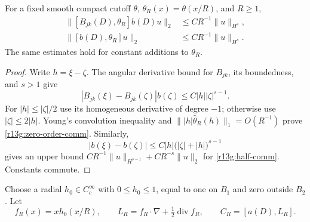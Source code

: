 \begin{lemma}
\label{lem:r13g-cutoff}
For a fixed smooth compact cutoff $\theta$, $\theta_R(x)=\theta(x/R)$,
and $R\ge1$,
\begin{align}
 \|[B_{jk}(D),\theta_R]b(D)u\|_2
 &\le CR^{-1}\|u\|_{H^s},\label{r13g:zero-order-comm}\\
 \|[b(D),\theta_R]u\|_2
 &\le CR^{-1}\|u\|_{H^s}.\label{r13g:half-comm}
\end{align}
The same estimates hold for constant additions to $\theta_R$.
\end{lemma}
\begin{proof}
Write $h=\xi-\zeta$. The angular derivative bound for $B_{jk}$,
its boundedness, and $s>1$ give
\[
 |B_{jk}(\xi)-B_{jk}(\zeta)|b(\zeta)
 \le C|h||\zeta|^{s-1}.
\]
For $|h|\le|\zeta|/2$ use its homogeneous derivative of degree $-1$;
otherwise use $|\zeta|\le2|h|$. Young's convolution inequality and
$\||h|\widehat\theta_R(h)\|_1=O(R^{-1})$ prove
\eqref{r13g:zero-order-comm}. Similarly,
\[
 |b(\xi)-b(\zeta)|
 \le C|h|\bigl(|\zeta|+|h|\bigr)^{s-1}
\]
gives an upper bound
$CR^{-1}\|u\|_{H^{s-1}}+CR^{-s}\|u\|_2$ for
\eqref{r13g:half-comm}. Constants commute.
\end{proof}

Choose a radial $h_0\in C_c^\infty$ with $0\le h_0\le1$, equal
to one on $B_1$ and zero outside $B_2$. Let
\[
 f_R(x)=x h_0(x/R),\qquad
 L_R=f_R\cdot\nabla+\tfrac12\operatorname{div}f_R,
 \qquad C_R=[a(D),L_R].
\]


